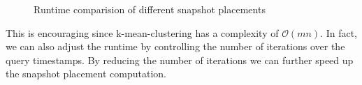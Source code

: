 \begin{figure}[t]
\centering
    \hfill
    \caption{Runtime comparision of different snapshot placements}
\end{figure}


This is encouraging since k-mean-clustering has a complexity of
$\mathcal{O}(mn)$.  In fact, we can also adjust the runtime by controlling the
number of iterations over the query timestamps.  By reducing the number of
iterations we can further speed up the snapshot placement computation.




